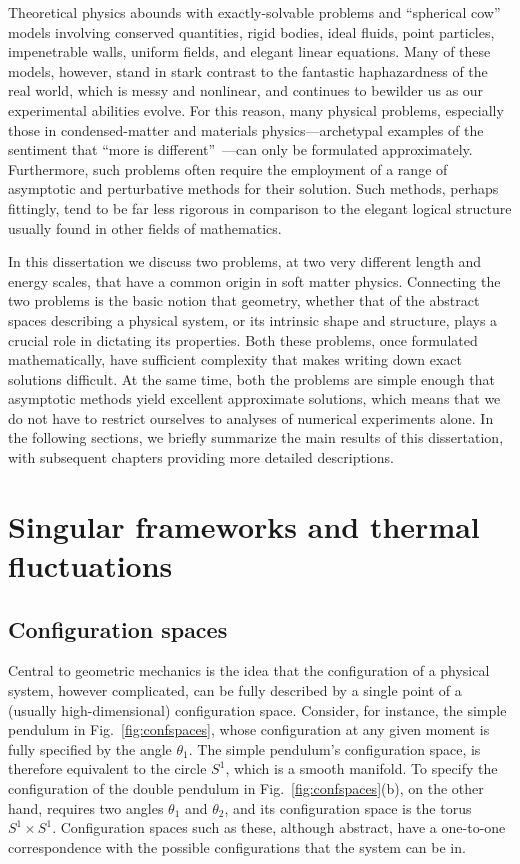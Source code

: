 Theoretical physics abounds with exactly-solvable problems and ``spherical cow'' models involving conserved quantities, rigid bodies, ideal fluids, point particles, impenetrable walls, uniform fields, and elegant linear equations.
Many of these models, however, stand in stark contrast to the fantastic haphazardness of the real world, which is messy and nonlinear, and continues to bewilder us as our experimental abilities evolve.
For this reason, many physical problems, especially those in condensed-matter and materials physics---archetypal examples of the sentiment that ``more is different''~\cite{anderson1972}---can only be formulated approximately.
Furthermore, such problems often require the employment of a range of asymptotic and perturbative methods for their solution.
Such methods, perhaps fittingly, tend to be far less rigorous in comparison to the elegant logical structure usually found in other fields of mathematics.

In this dissertation we discuss two problems, at two very different length and energy scales, that have a common origin in soft matter physics.  Connecting the two problems is the basic notion that geometry, whether that of the abstract spaces describing a physical system, or its intrinsic shape and structure, plays a crucial role in dictating its properties.  Both these problems, once formulated mathematically, have sufficient complexity that makes writing down exact solutions difficult.  At the same time, both the problems are simple enough that asymptotic methods yield excellent approximate solutions, which means that we do not have to restrict ourselves to analyses of numerical experiments alone.  In the following sections, we briefly summarize the main results of this dissertation, with subsequent chapters providing more detailed descriptions.

\section{Singular frameworks and thermal fluctuations}

\subsection{Configuration spaces}

Central to geometric mechanics is the idea that the configuration of a physical system, however complicated, can be fully described by a single point of a (usually high-dimensional) configuration space.
Consider, for instance, the simple pendulum in Fig.~\ref{fig:confspaces}, whose configuration at any given moment is fully specified by the angle $\theta_{1}$.
The simple pendulum's configuration space, is therefore equivalent to the circle $S^{1}$, which is a smooth manifold.
To specify the configuration of the double pendulum in Fig.~\ref{fig:confspaces}(b), on the other hand, requires two angles $\theta_{1}$ and $\theta_{2}$, and its configuration space is the torus $S^{1}\times S^{1}$.
Configuration spaces such as these, although abstract, have a one-to-one correspondence with the possible configurations that the system can be in.

